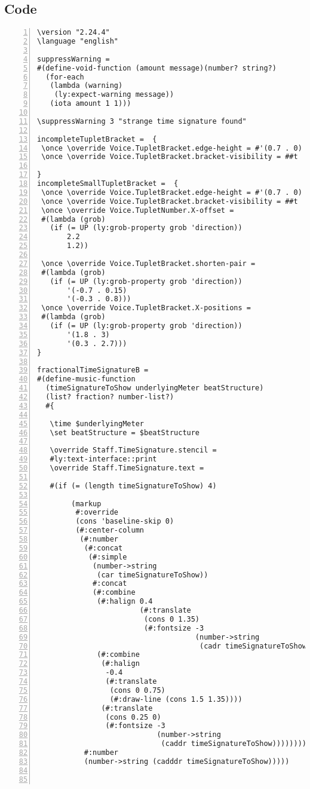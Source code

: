 \subsection{Code}
\begin{Verbatim}[numbers=left,xleftmargin=5mm]
\version "2.24.4"
\language "english"

suppressWarning =
#(define-void-function (amount message)(number? string?)
  (for-each
   (lambda (warning)
    (ly:expect-warning message))
   (iota amount 1 1)))

\suppressWarning 3 "strange time signature found"

incompleteTupletBracket =  {
 \once \override Voice.TupletBracket.edge-height = #'(0.7 . 0)
 \once \override Voice.TupletBracket.bracket-visibility = ##t

}
incompleteSmallTupletBracket =  {
 \once \override Voice.TupletBracket.edge-height = #'(0.7 . 0)
 \once \override Voice.TupletBracket.bracket-visibility = ##t
 \once \override Voice.TupletNumber.X-offset =
 #(lambda (grob)
   (if (= UP (ly:grob-property grob 'direction))
       2.2
       1.2))

 \once \override Voice.TupletBracket.shorten-pair =
 #(lambda (grob)
   (if (= UP (ly:grob-property grob 'direction))
       '(-0.7 . 0.15)
       '(-0.3 . 0.8)))
 \once \override Voice.TupletBracket.X-positions =
 #(lambda (grob)
   (if (= UP (ly:grob-property grob 'direction))
       '(1.8 . 3)
       '(0.3 . 2.7)))
}

fractionalTimeSignatureB =
#(define-music-function
  (timeSignatureToShow underlyingMeter beatStructure)
  (list? fraction? number-list?)
  #{

   \time $underlyingMeter
   \set beatStructure = $beatStructure

   \override Staff.TimeSignature.stencil =
   #ly:text-interface::print
   \override Staff.TimeSignature.text =

   #(if (= (length timeSignatureToShow) 4)

        (markup
         #:override
         (cons 'baseline-skip 0)
         (#:center-column
          (#:number
           (#:concat
            (#:simple
             (number->string
              (car timeSignatureToShow))
             #:concat
             (#:combine
              (#:halign 0.4
                        (#:translate
                         (cons 0 1.35)
                         (#:fontsize -3
                                     (number->string
                                      (cadr timeSignatureToShow)))))
              (#:combine
               (#:halign
                -0.4
                (#:translate
                 (cons 0 0.75)
                 (#:draw-line (cons 1.5 1.35))))
               (#:translate
                (cons 0.25 0)
                (#:fontsize -3
                            (number->string
                             (caddr timeSignatureToShow))))))))
           #:number
           (number->string (cadddr timeSignatureToShow)))))



\end{Verbatim}
